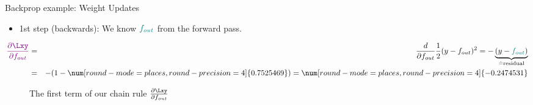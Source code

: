 \begin{vbframe}{Backprop example: Weight Updates}
  \begin{itemize}
    \item 1st step (backwards): We know $\textcolor{teal}{f_{out}}$ from the forward pass.
  \end{itemize}
    \begin{eqnarray*}
      \textcolor{violet}{\frac{\partial \Lxy}{\partial f_{out}}} &=& \frac{d}{\partial f_{out}} \frac{1}{2}(y - f_{out})^2 = -\underbrace{(y - \textcolor{teal}{f_{out}})}_{\hat{=} \text{residual}} \\
       &=& -(1 - \num[round-mode=places,round-precision=4]{0.7525469}) = \num[round-mode=places,round-precision=4]{-0.2474531}
    \end{eqnarray*}
    \begin{figure}
      \centering
        \caption{The first term of our chain rule $\frac{\partial \Lxy}{\partial f_{out}}$}
    \end{figure}
\framebreak


\end{vbframe}
